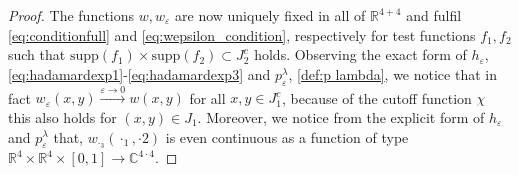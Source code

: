 \documentclass[b5paper,draft,openbib,12pt]{memoir}
\begin{document}
\begin{proof}
The functions \(w, w_\varepsilon\) are now uniquely fixed in all of \(\mathbb{R}^{4+4}\) and fulfil  \eqref{eq:conditionfull} and \eqref{eq:wepsilon_condition}, respectively
for test functions \(f_1,f_2\) such that \(\mathrm{supp}(f_1)\times \mathrm{supp}(f_2) \subset J_2^c\) holds. Observing the exact form of 
\(h_\varepsilon\), \eqref{eq:hadamardexp1}-\eqref{eq:hadamardexp3} and \(p_\varepsilon^{\lambda}\), \eqref{def:p lambda}, we notice that in fact 
\(w_{\varepsilon}(x,y) \xrightarrow{\varepsilon\rightarrow 0} w(x,y)\) for all \(x,y\in J_1^c\), because of the cutoff function \(\chi\) this also holds for \((x,y)\in J_1\). 
Moreover, we notice from the explicit form of \(h_\varepsilon\) and \(p_\varepsilon^{\lambda}\) that,
\(w_{\cdot_3}(\cdot_1,\cdot2)\) is even continuous as a function of type \(\mathbb{R}^4\times\mathbb{R}^4\times[0,1]\rightarrow \mathbb{C}^{4\cdot 4}\).
\end{proof}
\end{document}
